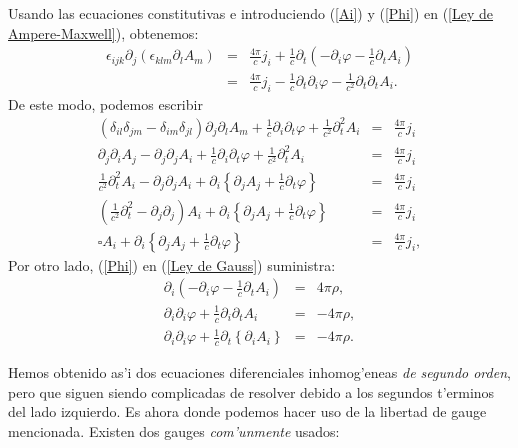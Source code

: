 Usando las ecuaciones constitutivas e introduciendo (\ref{Ai}) y (\ref{Phi}) en
(\ref{Ley de Ampere-Maxwell}), obtenemos:
\begin{eqnarray}
\epsilon_{ijk}\partial_{j}\left( \epsilon_{klm}\partial
_{l}A_{m}\right) & = &\frac{4\pi}{c} j_{i}+\frac{1}{c}\partial_{t}\left(
-\partial_{i}\varphi-\frac{1}{c}\partial_{t}A_{i}\right) \nonumber\\
 &=&\frac{4\pi}{c}
j_{i}-\frac{1}{c}\partial_{t}\partial_{i}\varphi-\frac{1}{c^2}\partial_{t}
\partial_{t}A_{i} .
\end{eqnarray}
De este modo, podemos escribir
\begin{eqnarray}
\left( \delta_{il}\delta_{jm}-\delta_{im}\delta_{jl}\right) \partial
_{j}\partial_{l}A_{m}+\frac{1}{c}\partial_{i}\partial_{t}\varphi+\frac{1}{c^2}
\partial_{t}^{2}A_{i} & = &\frac{4\pi}{c} j_{i}\\
\partial_{j}\partial_{i}A_{j}-\partial_{j}\partial_{j}A_{i}+\frac{1}{c}\partial_
{i}\partial_{t}\varphi+\frac{1}{c^{2}}\partial_{t}^{2}A_{i} &=&\frac{4\pi}{c}
j_{i} \\
\frac{1}{c^{2}}\partial_{t}^{2}A_{i}-\partial_{j}\partial_{j}A_{i}+\partial_{i}
\left\{ \partial_{j}A_{j}+\frac{1}{c}\partial_{t}\varphi\right\} & =
&\frac{4\pi}{c} j_{i} \\
\left( \frac{1}{c^{2}}\partial_{t}^{2}-\partial_{j}\partial_{j}\right)
A_{i}+\partial_{i}\left\{
\partial_{j}A_{j}+\frac{1}{c}\partial_{t}\varphi\right\} & = &\frac{4\pi}{c}
j_{i}\\
\square A_{i}+\partial_{i}\left\{
\partial_{j}A_{j}+\frac{1}{c}\partial_{t}\varphi\right\} & = &\frac{4\pi}{c}
j_{i}, \label{ecuacion1}
\end{eqnarray}
Por otro lado, (\ref{Phi}) en (\ref{Ley de Gauss}) suministra:
\begin{eqnarray}
\partial_{i}\left( -\partial_{i}\varphi-\frac{1}{c}\partial_{t}A_{i}\right) & =
&4\pi \rho ,\\
\partial_{i}\partial_{i}\varphi+\frac{1}{c}\partial_{i}\partial_{t}A_{i} & =
&-4\pi\rho ,\\
\partial_{i}\partial_{i}\varphi+\frac{1}{c}\partial_{t}\left\{
\partial_{i}A_{i}\right\} & =&-4\pi\rho.\label{ecuacion2}
\end{eqnarray}

Hemos obtenido as'i dos ecuaciones diferenciales inhomog'eneas \textit{de
segundo orden}, pero que siguen siendo complicadas de resolver debido a los
segundos t'erminos del lado izquierdo. Es ahora donde podemos hacer uso de
la libertad de gauge mencionada. Existen dos gauges \textit{com'unmente} usados:

